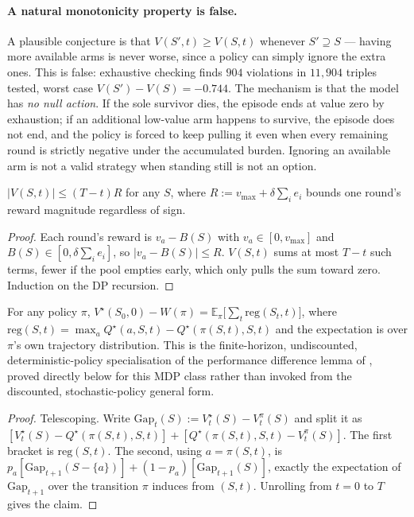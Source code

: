 \paragraph{A natural monotonicity property is false.} A plausible conjecture is
that $V(S',t) \ge V(S,t)$ whenever $S' \supseteq S$ --- having more available arms
is never worse, since a policy can simply ignore the extra ones. This is false:
exhaustive checking finds $904$ violations in $11{,}904$ triples tested, worst case
$V(S')-V(S) = -0.744$. The mechanism is that the model has \emph{no null action}.
If the sole survivor dies, the episode ends at value zero by exhaustion; if an
additional low-value arm happens to survive, the episode does not end, and the
policy is forced to keep pulling it even when every remaining round is strictly
negative under the accumulated burden. Ignoring an available arm is not a valid
strategy when standing still is not an option.

\begin{lemma}
\label{lem:magnitude}
$|V(S,t)| \le (T-t)R$ for any $S$, where $R := v_{\max} + \delta\sum_i e_i$ bounds
one round's reward magnitude regardless of sign.
\end{lemma}

\begin{proof}
Each round's reward is $v_a - B(S)$ with $v_a \in [0, v_{\max}]$ and
$B(S) \in [0,\delta\sum_i e_i]$, so $|v_a - B(S)| \le R$. $V(S,t)$ sums at most
$T-t$ such terms, fewer if the pool empties early, which only pulls the sum toward
zero. Induction on the DP recursion.
\end{proof}

\begin{theorem}
\label{thm:pd}
For any policy $\pi$, $V^\star(S_0,0) - W(\pi) = \mathbb{E}_\pi\big[\sum_t
\mathrm{reg}(S_t,t)\big]$, where $\mathrm{reg}(S,t) = \max_a Q^\star(a,S,t) -
Q^\star(\pi(S,t),S,t)$ and the expectation is over $\pi$'s own trajectory
distribution. This is the finite-horizon, undiscounted, deterministic-policy
specialisation of the performance difference lemma of
\citet{kakadelangford2002}, proved directly below for this
MDP class rather than invoked from the discounted, stochastic-policy general
form.
\end{theorem}

\begin{proof}
Telescoping. Write $\mathrm{Gap}_t(S) := V^\star_t(S) - V^\pi_t(S)$ and split it as
$[V^\star_t(S) - Q^\star(\pi(S,t),S,t)] + [Q^\star(\pi(S,t),S,t) - V^\pi_t(S)]$. The
first bracket is $\mathrm{reg}(S,t)$. The second, using $a=\pi(S,t)$, is
$p_a[\mathrm{Gap}_{t+1}(S{-}\{a\})] + (1-p_a)[\mathrm{Gap}_{t+1}(S)]$, exactly the
expectation of $\mathrm{Gap}_{t+1}$ over the transition $\pi$ induces from $(S,t)$.
Unrolling from $t=0$ to $T$ gives the claim.
\end{proof}

